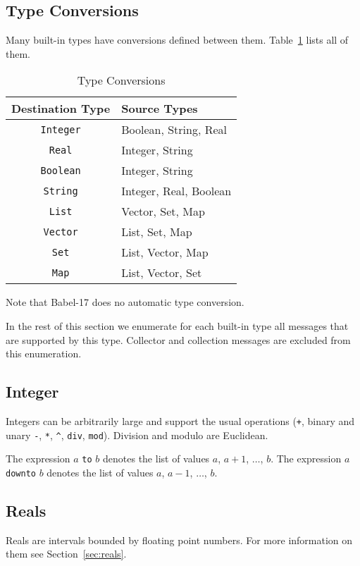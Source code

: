 \documentclass[11pt]{amsart}
\newcommand{\babelsrc}[1] {\lstinline!#1!}
\begin{document}
\subsection{Type Conversions}
Many built-in types have conversions defined between them. Table~\ref{tab:typeconversions} lists all of them.
\begin{table}
\caption{Type Conversions}
\begin{tabular}{c|l}
\textbf{Destination Type} & \textbf{Source Types} \\\hline
\babelsrc{Integer} & Boolean, String, Real \\
\babelsrc{Real} & Integer, String \\
\babelsrc{Boolean} & Integer, String \\
\babelsrc{String} & Integer, Real, Boolean \\
\babelsrc{List} &  Vector, Set, Map \\
\babelsrc{Vector} & List, Set, Map \\
\babelsrc{Set} & List, Vector, Map \\
\babelsrc{Map} & List, Vector, Set \\
\end{tabular}
\label{tab:typeconversions}
\end{table}
Note that Babel-17 does no automatic type conversion.

In the rest of this section we enumerate for each built-in type all messages that are supported by this type. Collector and collection messages are excluded from this enumeration.

\subsection{Integer}
Integers can be arbitrarily large and support the usual operations (\texttt{+}, binary and unary \texttt{-}, \texttt{*}, \texttt{\^}, \babelsrc{div}, \babelsrc{mod}). Division and modulo are Euclidean.

The expression $a$ \texttt{to} $b$ denotes the list of values $a$, $a+1$, $\ldots$, $b$. The expression $a$  \texttt{downto} $b$ denotes the list of values  $a$, $a-1$, $\ldots$, $b$. 

\subsection{Reals}
Reals are intervals bounded by floating point numbers. For more information on them see Section~\ref{sec:reals}.
\end{document}
